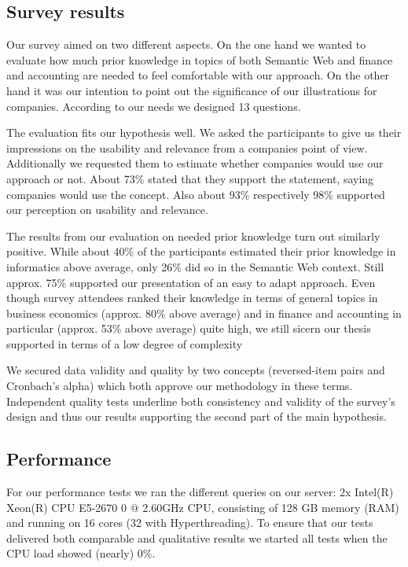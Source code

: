 \documentclass[runningheads]{llncs}
\begin{document}
\subsection{Survey results}\label{5.2.}

Our survey aimed on two different aspects.
On the one hand we wanted to evaluate how much prior knowledge in topics of both Semantic Web and finance and accounting are needed to feel comfortable with our approach.
On the other hand it was our intention to point out the significance of our illustrations for companies.
According to our needs we designed 13 questions.

The evaluation fits our hypothesis well.
We asked the participants to give us their impressions on the usability and relevance from a companies point of view.
Additionally we requested them to estimate whether companies would use our approach or not.
About 73\% stated that they support the statement, saying companies would use the concept.
Also about 93\% respectively 98\% supported our perception on usability and relevance.

The results from our evaluation on needed prior knowledge turn out similarly positive.
While about 40\% of the participants estimated their prior knowledge in informatics above average, only 26\% did so in the Semantic Web context.
Still approx. 75\% supported our presentation of an easy to adapt approach.
Even though survey attendees ranked their knowledge in terms of general topics in business economics (approx. 80\% above average) and in finance and accounting in particular (approx. 53\% above average) quite high, we still sicern our thesis supported in terms of a low degree of complexity

We secured data validity and quality by two concepts (reversed-item pairs and Cronbach's alpha) which both approve our methodology in these terms.
Independent quality tests underline both consistency and validity of the survey's design and thus our results supporting the second part of the main hypothesis.

\subsection{Performance}
\label{5.3.}
For our performance tests we ran the different queries on our server: 2x Intel(R) Xeon(R) CPU E5-2670 0 @ 2.60GHz CPU, consisting of 128 GB memory (RAM) and running on 16 cores (32 with Hyperthreading). To ensure that our tests delivered both comparable and qualitative results we started all tests when the CPU load showed (nearly) 0\%.
\end{document}
